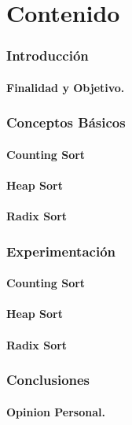\documentclass[a4paper]{article} %
\begin{document}
	
	\part{Contenido}
	
	\section{Introducción}
		\subsection{ Finalidad y Objetivo.}
		
	\section{Conceptos Básicos}
		\subsection{Counting Sort}
		\subsection{Heap Sort}
		\subsection{Radix Sort}
		
	\section{Experimentación}
		\subsection{Counting Sort}
		\subsection{Heap Sort}
		\subsection{Radix Sort}			
			
	\section{Conclusiones}
		\subsection{Opinion Personal.}	
\end{document}

